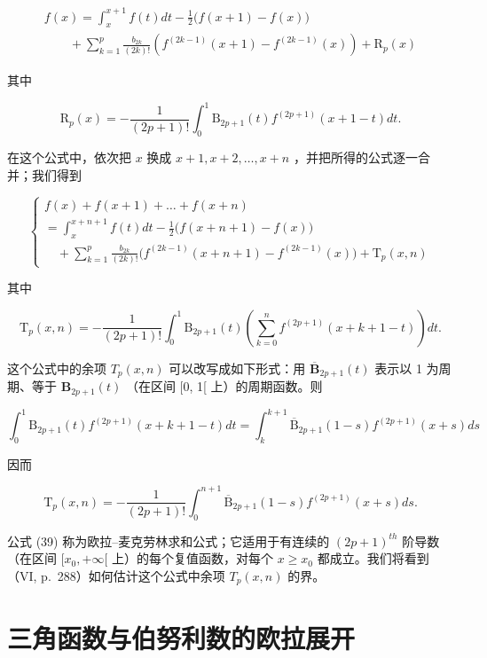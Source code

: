 \[
\begin{array}{l} f (x) = \int_ {x} ^ {x + 1} f (t) d t - \frac {1}{2} \big (f (x + 1) - f (x) \big) \\ \qquad + \sum_ {k = 1} ^ {p} \frac {b _ {2 k}}{(2 k) !} \left(f ^ {(2 k - 1)} (x + 1) - f ^ {(2 k - 1)} (x)\right) + \mathrm{R} _ {p} (x) \end{array}\tag{37}
\]

其中

\[
\mathrm{R} _ {p} (x) = - \frac {1}{(2 p + 1) !} \int_ {0} ^ {1} \mathrm{B} _ {2 p + 1} (t) f ^ {(2 p + 1)} (x + 1 - t) d t.\tag{38}
\]

在这个公式中，依次把 \(x\) 换成 \(x + 1, x + 2, \ldots, x + n\) ，并把所得的公式逐一合并；我们得到

\[
\left\{ \begin{array}{l} f (x) + f (x + 1) + \dots + f (x + n) \\ = \int_ {x} ^ {x + n + 1} f (t) d t - \frac {1}{2} \bigl (f (x + n + 1) - f (x) \bigr) \\ \quad + \sum_ {k = 1} ^ {p} \frac {b _ {2 k}}{(2 k) !} \bigl (f ^ {(2 k - 1)} (x + n + 1) - f ^ {(2 k - 1)} (x) \bigr) + \mathrm{T} _ {p} (x, n) \end{array} \right.\tag{39}
\]

其中

\[
\mathrm{T} _ {p} (x, n) = - \frac {1}{(2 p + 1) !} \int_ {0} ^ {1} \mathrm{B} _ {2 p + 1} (t) \left(\sum_ {k = 0} ^ {n} f ^ {(2 p + 1)} (x + k + 1 - t)\right) d t.\tag{40}
\]

这个公式中的余项 \(T_{p}(x,n)\) 可以改写成如下形式：用 \(\overline{\mathbf{B}}_{2p+1}(t)\) 表示以 1 为周期、等于 \(\mathbf{B}_{2p+1}(t)\) （在区间 {[}0, 1{[} 上）的周期函数。则

\[
\int_ {0} ^ {1} \mathrm{B} _ {2 p + 1} (t) f ^ {(2 p + 1)} (x + k + 1 - t) d t = \int_ {k} ^ {k + 1} \overline {{\mathrm{B}}} _ {2 p + 1} (1 - s) f ^ {(2 p + 1)} (x + s) d s
\]

因而

\[
\mathrm{T} _ {p} (x, n) = - \frac {1}{(2 p + 1) !} \int_ {0} ^ {n + 1} \overline {{\mathrm{B}}} _ {2 p + 1} (1 - s) f ^ {(2 p + 1)} (x + s) d s.\tag{41}
\]

公式 (39) 称为欧拉–麦克劳林求和公式；它适用于有连续的 \((2p+1)^{th}\) 阶导数（在区间 \([x_{0},+\infty[\) 上）的每个复值函数，对每个 \(x\geqslant x_{0}\) 都成立。我们将看到（VI, p.~288）如何估计这个公式中余项 \(T_{p}(x,n)\) 的界。

\section{三角函数与伯努利数的欧拉展开}

